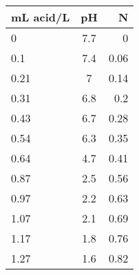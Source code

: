 \begin{center}
\hspace{5mm}
        \begin{tabular}{|l c r|}
            \hline
            \textbf{mL acid/L} & \textbf{pH} & \textbf{N} \\ \hline
            0 & 7.7 & 0\\
            0.1 & 7.4 & 0.06\\ 
            0.21 & 7 & 0.14\\ 
            0.31 & 6.8 & 0.2\\ 
            0.43 & 6.7 & 0.28\\ 
            0.54 & 6.3 & 0.35\\ 
            0.64 & 4.7 & 0.41\\ 
            0.87 & 2.5 & 0.56\\ 
            0.97 & 2.2 & 0.63\\ 
            1.07 & 2.1 & 0.69\\ 
            1.17 & 1.8 & 0.76\\ 
            1.27 & 1.6 & 0.82\\ \hline
        \end{tabular}\\
        \newpage

\end{center}
